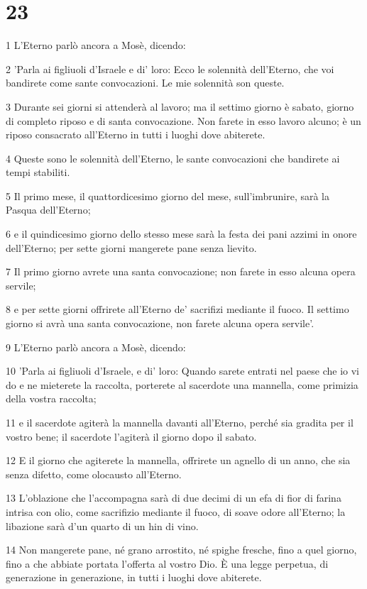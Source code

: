 \chapter{23}

\par 1 L'Eterno parlò ancora a Mosè, dicendo:
\par 2 'Parla ai figliuoli d'Israele e di' loro: Ecco le solennità dell'Eterno, che voi bandirete come sante convocazioni. Le mie solennità son queste.
\par 3 Durante sei giorni si attenderà al lavoro; ma il settimo giorno è sabato, giorno di completo riposo e di santa convocazione. Non farete in esso lavoro alcuno; è un riposo consacrato all'Eterno in tutti i luoghi dove abiterete.
\par 4 Queste sono le solennità dell'Eterno, le sante convocazioni che bandirete ai tempi stabiliti.
\par 5 Il primo mese, il quattordicesimo giorno del mese, sull'imbrunire, sarà la Pasqua dell'Eterno;
\par 6 e il quindicesimo giorno dello stesso mese sarà la festa dei pani azzimi in onore dell'Eterno; per sette giorni mangerete pane senza lievito.
\par 7 Il primo giorno avrete una santa convocazione; non farete in esso alcuna opera servile;
\par 8 e per sette giorni offrirete all'Eterno de' sacrifizi mediante il fuoco. Il settimo giorno si avrà una santa convocazione, non farete alcuna opera servile'.
\par 9 L'Eterno parlò ancora a Mosè, dicendo:
\par 10 'Parla ai figliuoli d'Israele, e di' loro: Quando sarete entrati nel paese che io vi do e ne mieterete la raccolta, porterete al sacerdote una mannella, come primizia della vostra raccolta;
\par 11 e il sacerdote agiterà la mannella davanti all'Eterno, perché sia gradita per il vostro bene; il sacerdote l'agiterà il giorno dopo il sabato.
\par 12 E il giorno che agiterete la mannella, offrirete un agnello di un anno, che sia senza difetto, come olocausto all'Eterno.
\par 13 L'oblazione che l'accompagna sarà di due decimi di un efa di fior di farina intrisa con olio, come sacrifizio mediante il fuoco, di soave odore all'Eterno; la libazione sarà d'un quarto di un hin di vino.
\par 14 Non mangerete pane, né grano arrostito, né spighe fresche, fino a quel giorno, fino a che abbiate portata l'offerta al vostro Dio. È una legge perpetua, di generazione in generazione, in tutti i luoghi dove abiterete.
